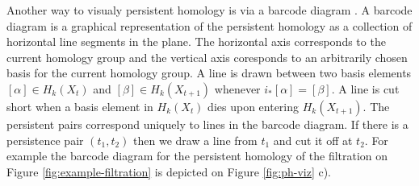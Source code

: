 Another way to visualy persistent homology is via a barcode diagram \cite{barcodes}. A barcode diagram is a graphical representation of the persistent homology as a collection of horizontal line segments in the plane. The horizontal axis corresponds to the current homology group and the vertical axis coresponds to an arbitrarily chosen basis for the current homology group. A line is drawn between two basis elements $[\alpha] \in H_k(X_t)$ and $[\beta] \in H_k(X_{t+1})$ whenever $i_*[\alpha] = [\beta]$. A line is cut short when a basis element in $H_k(X_t)$ dies upon entering $H_k(X_{t+1})$. The persistent pairs correspond uniquely to lines in the barcode diagram. If there is a persistence pair $(t_1, t_2)$ then we draw a line from $t_1$ and cut it off at $t_2$. For example the barcode diagram for the persistent homology of the filtration on Figure \ref{fig:example-filtration} is depicted on Figure \ref{fig:ph-viz} c).

